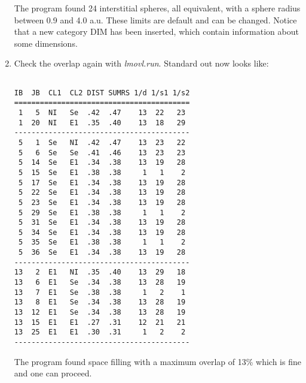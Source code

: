 \documentclass[aps,twocolumn,a4]{revtex4}
\begin{document}
\begin{enumerate}
The program found 24 interstitial spheres, all equivalent, with a sphere
radius between 0.9 and 4.0 a.u. These limits are default and can be
changed. Notice that a new category DIM has been inserted, which
contain information about some dimensions.

\item Check the overlap again with {\em lmovl.run}. Standard out now
looks like:
\begin{verbatim}

IB  JB  CL1  CL2 DIST SUMRS 1/d 1/s1 1/s2
=========================================
 1   5  NI   Se  .42  .47    13  22   23
 1  20  NI   E1  .35  .40    13  18   29
-----------------------------------------
 5   1  Se   NI  .42  .47    13  23   22
 5   6  Se   Se  .41  .46    13  23   23
 5  14  Se   E1  .34  .38    13  19   28
 5  15  Se   E1  .38  .38     1   1    2
 5  17  Se   E1  .34  .38    13  19   28
 5  22  Se   E1  .34  .38    13  19   28
 5  23  Se   E1  .34  .38    13  19   28
 5  29  Se   E1  .38  .38     1   1    2
 5  31  Se   E1  .34  .38    13  19   28
 5  34  Se   E1  .34  .38    13  19   28
 5  35  Se   E1  .38  .38     1   1    2
 5  36  Se   E1  .34  .38    13  19   28
-----------------------------------------
13   2  E1   NI  .35  .40    13  29   18
13   6  E1   Se  .34  .38    13  28   19
13   7  E1   Se  .38  .38     1   2    1
13   8  E1   Se  .34  .38    13  28   19
13  12  E1   Se  .34  .38    13  28   19
13  15  E1   E1  .27  .31    12  21   21
13  25  E1   E1  .30  .31     1   2    2
-----------------------------------------
\end{verbatim}

The program found space filling with a
maximum overlap of 13\% which is fine and one can proceed.


\end{enumerate}
\end{document}
